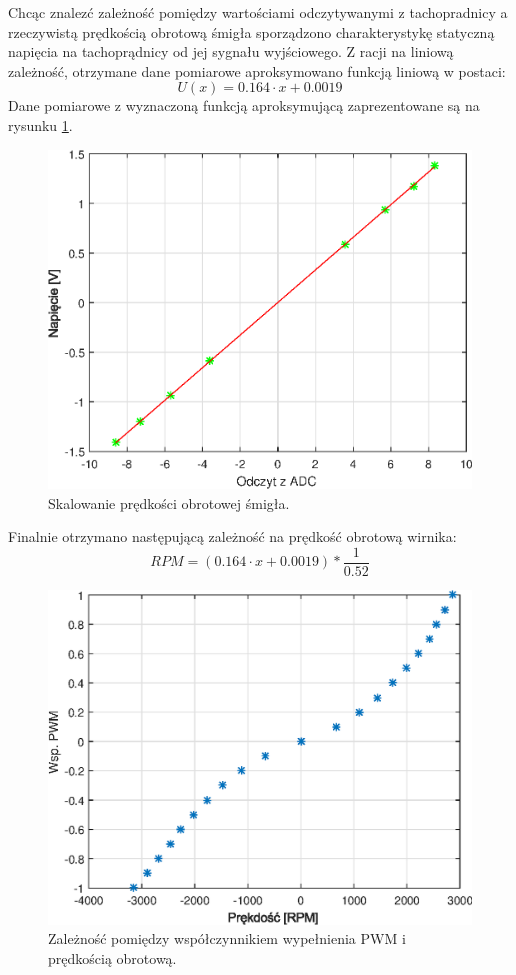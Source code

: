 Chcąc znalezć zależność pomiędzy wartościami odczytywanymi z tachopradnicy a rzeczywistą prędkością obrotową śmigła sporządzono charakterystykę statyczną napięcia na tachoprądnicy od jej sygnału wyjściowego. Z racji na liniową zależność, otrzymane dane pomiarowe aproksymowano funkcją liniową w postaci:
\begin{equation}\label{key}
U(x) = 0.164 \cdot x + 0.0019
\end{equation}
Dane pomiarowe z wyznaczoną funkcją aproksymującą zaprezentowane są na rysunku \ref{skal_pred}.
\begin{figure}[h!]
	\centering
	\includegraphics[scale = 1]{fig/skal_predkosci.eps}
	\caption		
	{Skalowanie prędkości obrotowej śmigła.}
	\label{skal_pred}
\end{figure}
Finalnie otrzymano następującą zależność na prędkość obrotową wirnika: 
\begin{equation}\label{key}
RPM = (0.164 \cdot x + 0.0019 ) * \frac{1}{0.52}
\end{equation}
\begin{figure}[h!]
	\centering
	\includegraphics[scale = 1]{fig/PWM_predkosci.eps}
	\caption		
	{Zależność pomiędzy współczynnikiem wypełnienia PWM i prędkością obrotową.}
	\label{PWM_pred}
\end{figure}